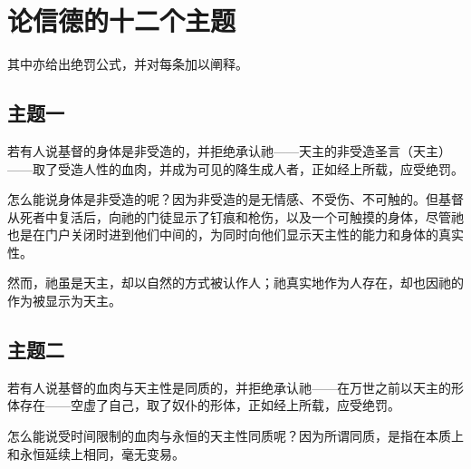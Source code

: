 
\chapter{论信德的十二个主题}


其中亦给出绝罚公式，并对每条加以阐释。\par


\section{主题一}

若有人说基督的身体是非受造的，并拒绝承认祂——天主的非受造圣言（天主）——取了受造人性的血肉，并成为可见的降生成人者，正如经上所载，应受绝罚。\par

\par

怎么能说身体是非受造的呢？因为非受造的是无情感、不受伤、不可触的。但基督从死者中复活后，向祂的门徒显示了钉痕和枪伤，以及一个可触摸的身体，尽管祂也是在门户关闭时进到他们中间的，为同时向他们显示天主性的能力和身体的真实性。\par

然而，祂虽是天主，却以自然的方式被认作人；祂真实地作为人存在，却也因祂的作为被显示为天主。\par


\section{主题二}

若有人说基督的血肉与天主性是同质的，并拒绝承认祂——在万世之前以天主的形体存在——空虚了自己，取了奴仆的形体，正如经上所载，应受绝罚。\par

\par

怎么能说受时间限制的血肉与永恒的天主性同质呢？因为所谓同质，是指在本质上和永恒延续上相同，毫无变易。\par

